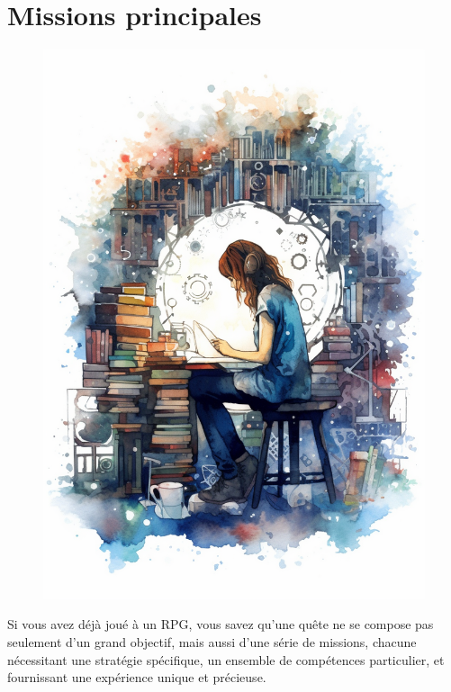 \part*{Missions principales}
\setcounter{tocdepth}{1}
\setcounter{chapter}{0}

\begin{figure}[H]
    \center
    \includegraphics[keepaspectratio, width=\textwidth, height=\textheight]{images/c5d11eeb-229e-484c-aaba-872894c5e256.png}
\end{figure}

Si vous avez déjà joué à un RPG, vous savez qu'une quête ne se compose pas seulement d'un grand objectif, mais aussi d'une série de missions, chacune nécessitant une stratégie spécifique, un ensemble de compétences particulier, et fournissant une expérience unique et précieuse.

